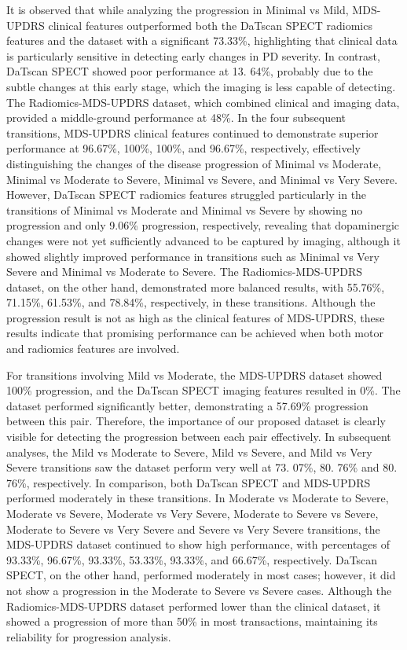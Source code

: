 \documentclass{article}
\begin{document}
It is observed that while analyzing the progression in Minimal vs Mild, MDS-UPDRS clinical features outperformed both the DaTscan SPECT radiomics features and the dataset with a significant 73.33\%, highlighting that clinical data is particularly sensitive in detecting early changes in PD severity. In contrast, DaTscan SPECT showed poor performance at 13. 64\%, probably due to the subtle changes at this early stage, which the imaging is less capable of detecting. The Radiomics-MDS-UPDRS dataset, which combined clinical and imaging data, provided a middle-ground performance at 48\%. In the four subsequent transitions, MDS-UPDRS clinical features continued to demonstrate superior performance at 96.67\%, 100\%, 100\%, and 96.67\%, respectively, effectively distinguishing the changes of the disease progression of Minimal vs Moderate, Minimal vs Moderate to Severe, Minimal vs Severe, and Minimal vs Very Severe. However, DaTscan SPECT radiomics features struggled particularly in the transitions of Minimal vs Moderate and Minimal vs Severe by showing no progression and only 9.06\% progression, respectively, revealing that dopaminergic changes were not yet sufficiently advanced to be captured by imaging, although it showed slightly improved performance in transitions such as Minimal vs Very Severe and Minimal vs Moderate to Severe. The Radiomics-MDS-UPDRS dataset, on the other hand, demonstrated more balanced results, with 55.76\%, 71.15\%, 61.53\%, and 78.84\%, respectively, in these transitions. Although the progression result is not as high as the clinical features of MDS-UPDRS, these results indicate that promising performance can be achieved when both motor and radiomics features are involved.

For transitions involving Mild vs Moderate, the MDS-UPDRS dataset showed 100\% progression, and the DaTscan SPECT imaging features resulted in 0\%. The dataset performed significantly better, demonstrating a 57.69\% progression between this pair. Therefore, the importance of our proposed dataset is clearly visible for detecting the progression between each pair effectively. In subsequent analyses, the Mild vs Moderate to Severe, Mild vs Severe, and Mild vs Very Severe transitions saw the dataset perform very well at 73. 07\%, 80. 76\% and 80. 76\%, respectively. In comparison, both DaTscan SPECT and MDS-UPDRS performed moderately in these transitions. In Moderate vs Moderate to Severe, Moderate vs Severe, Moderate vs Very Severe, Moderate to Severe vs Severe, Moderate to Severe vs Very Severe and Severe vs Very Severe transitions, the MDS-UPDRS dataset continued to show high performance, with percentages of 93.33\%, 96.67\%, 93.33\%, 53.33\%, 93.33\%, and 66.67\%, respectively. DaTscan SPECT, on the other hand, performed moderately in most cases; however, it did not show a progression in the Moderate to Severe vs Severe cases. Although the Radiomics-MDS-UPDRS dataset performed lower than the clinical dataset, it showed a progression of more than 50\% in most transactions, maintaining its reliability for progression analysis.
\end{document}
